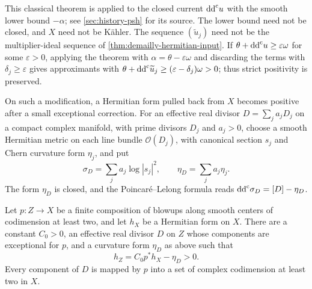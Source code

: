 This classical theorem is applied to the closed current $\mathrm{dd}^{\mathrm{c}} u$ with the smooth lower bound $-\alpha$; see \cref{sec:history-psh} for its source. The lower bound need not be closed, and $X$ need not be K\"ahler. The sequence $(\widetilde u_j)$ need not be the multiplier-ideal sequence of \cref{thm:demailly-hermitian-input}. If $\theta+\mathrm{dd}^{\mathrm{c}} u\geq\varepsilon\omega$ for some $\varepsilon>0$, applying the theorem with $\alpha=\theta-\varepsilon\omega$ and discarding the terms with $\delta_j\geq\varepsilon$ gives approximants with $\theta+\mathrm{dd}^{\mathrm{c}}\widetilde u_j\geq(\varepsilon-\delta_j)\omega>0$; thus strict positivity is preserved.

On such a modification, a Hermitian form pulled back from $X$ becomes positive after a small exceptional correction. For an effective real divisor $D=\sum_ja_jD_j$ on a compact complex manifold, with prime divisors $D_j$ and $a_j>0$, choose a smooth Hermitian metric on each line bundle $\mathcal O(D_j)$, with canonical section $s_j$ and Chern curvature form $\eta_j$, and put
\[
 \sigma_D=\sum_ja_j\log|s_j|^2,\qquad \eta_D=\sum_ja_j\eta_j.
\]
The form $\eta_D$ is closed, and the Poincar\'e--Lelong formula reads $\mathrm{dd}^{\mathrm{c}}\sigma_D=[D]-\eta_D$.

\begin{lemma}\label{lem:nef-blowup-metric}
Let $p\colon Z\to X$ be a finite composition of blowups along smooth centers of codimension at least two, and let $h_X$ be a Hermitian form on $X$. There are a constant $C_0>0$, an effective real divisor $D$ on $Z$ whose components are exceptional for $p$, and a curvature form $\eta_D$ as above such that
\begin{equation}\label{eq:nef-blowup-positive-metric}
 h_Z=C_0p^*h_X-\eta_D>0.
\end{equation}
Every component of $D$ is mapped by $p$ into a set of complex codimension at least two in $X$.
\end{lemma}

